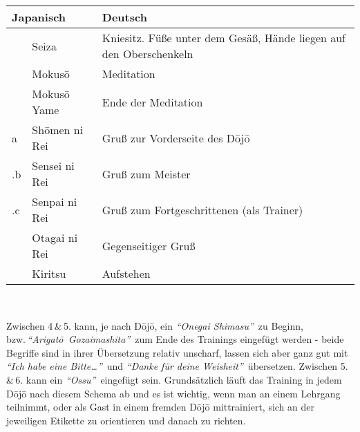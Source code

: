 \setcounter{num}{0}
\setcounter{numz}{0}
\begin{tcolorbox}[colframe=lightgray,colback=white,coltitle=black,title=Allgemeines:\indent Trainingsablauf Begrüßung und Ende]
	\null\vfill\null	
	\begin{tabularx}{\textwidth}{llX}
		\multicolumn{2}{l}{\textbf{Japanisch}} 	& \textbf{Deutsch}\\
		\midrule
		\ctu		& Seiza 				& Kniesitz. Füße unter dem Gesäß, Hände liegen auf den Oberschenkeln\\
		\ctu		& Mokus\={o}			& Meditation\\
		\ctu		& Mokus\={o} Yame		& Ende der Meditation\\
		\ctu a		& Sh\={o}men ni Rei		& Gruß zur Vorderseite des D\={o}j\={o}\\
		\thenum .b	& Sensei ni Rei			& Gruß zum Meister\\
		\thenum .c	& Senpai ni Rei			& Gruß zum Fortgeschrittenen (als Trainer)\\
		\ctu		& Otagai ni Rei			& Gegenseitiger Gruß\\
		\ctu		& Kiritsu				& Aufstehen\\		
		\midrule
	\end{tabularx}\\\null\vfill\null
	\begin{center}
		\parbox{\textwidth-2\tabcolsep}{Zwischen 4\,\&\,5. kann, je nach D\={o}j\={o}, ein \textit{\textquotedblleft Onegai Shimasu\textquotedblright}~zu Beginn, bzw.\,\textit{\mbox{\textquotedblleft Arigat\={o} Gozaimashita\textquotedblright}}~zum Ende des Trainings eingefügt werden - beide Begriffe sind in ihrer Übersetzung relativ unscharf, lassen sich aber ganz gut mit \textit{\textquotedblleft Ich habe eine Bitte\dots\textquotedblright}~und \textit{\textquotedblleft Danke für deine Weisheit\textquotedblright}~übersetzen. Zwischen 5.\,\&\,6. kann ein \textit{\textquotedblleft Ossu\textquotedblright}~eingefügt sein. Grundsätzlich läuft das Training in jedem D\={o}j\={o} nach diesem Schema ab und es ist wichtig, wenn man an einem Lehrgang teilnimmt, oder als Gast in einem fremden D\={o}j\={o} mittrainiert, sich an der jeweiligen Etikette zu orientieren und danach zu richten.}
	\end{center}\null\vfill\null
\end{tcolorbox}
\clearpage
\pagebreak
\setcounter{num}{10}
